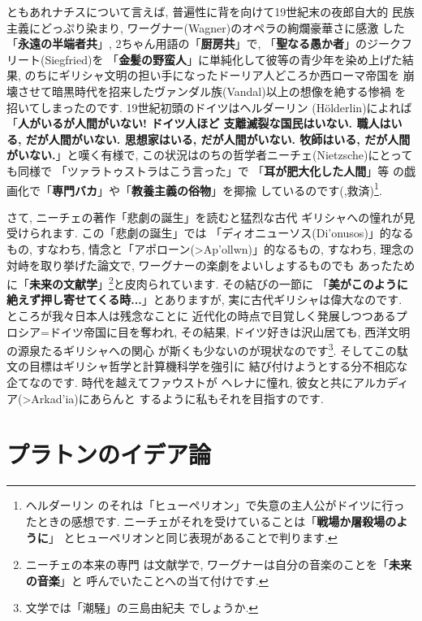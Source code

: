 ともあれナチスについて言えば, 普遍性に背を向けて19世紀末の夜郎自大的
民族主義にどっぷり染まり, ワーグナー(Wagner)のオペラの絢爛豪華さに感激
した「\textbf{永遠の半端者共}」, 2ちゃん用語の「\textbf{厨房共}」で,
 「\textbf{聖なる愚か者}」のジークフリート(Siegfried)を
「\textbf{金髪の野蛮人}」に単純化して彼等の青少年を染め上げた結果,
 のちにギリシャ文明の担い手になったドーリア人どころか西ローマ帝国を
崩壊させて暗黒時代を招来したヴァンダル族(Vandal)以上の想像を絶する惨禍
を招いてしまったのです. 19世紀初頭のドイツはヘルダーリン
(H\"olderlin)によれば「\textbf{人がいるが人間がいない! ドイツ人ほど
支離滅裂な国民はいない. 職人はいる, だが人間がいない. 思想家はいる,
 だが人間がいない. 牧師はいる, だが人間がいない.}」と嘆く有様で,
 この状況はのちの哲学者ニーチェ(Nietzsche)にとっても同様で
「ツァラトゥストラはこう言った」で 「\textbf{耳が肥大化した人間}」等
の戯画化で「\textbf{専門バカ}」や「\textbf{教養主義の俗物}」を揶揄
しているのです(\cite{ツァラトゥストラ},救済)\footnote{ヘルダーリン
のそれは「ヒューペリオン」で失意の主人公がドイツに行ったときの感想です.
 ニーチェがそれを受けていることは「\textbf{戦場か屠殺場のように}」
 とヒューペリオンと同じ表現があることで判ります.}.
\newline

さて, ニーチェの著作「悲劇の誕生」\cite{悲劇の誕生}を読むと猛烈な古代
ギリシャへの憧れが見受けられます. この「悲劇の誕生」では
「ディオニューソス(\textgreek{Di'onusos})」的なるもの, すなわち,
情念と「アポローン(\textgreek{>Ap'ollwn})」的なるもの, すなわち,
 理念の対峙を取り挙げた論文で, ワーグナーの楽劇をよいしょするものでも
あったために「\textbf{未来の文献学}」\footnote{ニーチェの本来の専門
は文献学で, ワーグナーは自分の音楽のことを「\textbf{未来の音楽}」と
呼んでいたことへの当て付けです.}と皮肉られています. その結びの一節に
「\textbf{美がこのように絶えず押し寄せてくる時...}」とありますが,
 実に古代ギリシャは偉大なのです. ところが我々日本人は残念なことに
近代化の時点で目覚しく発展しつつあるプロシア=ドイツ帝国に目を奪われ,
 その結果, ドイツ好きは沢山居ても, 西洋文明の源泉たるギリシャへの関心
が斯くも少ないのが現状なのです\footnote{文学では「潮騒」の三島由紀夫
でしょうか.}. そしてこの駄文の目標はギリシャ哲学と計算機科学を強引に
結び付けようとする分不相応な企てなのです. 時代を越えてファウストが
ヘレナに憧れ, 彼女と共にアルカディア(\textgreek{>Arkad'ia})にあらんと
するように私もそれを目指すのです.

\section{プラトンのイデア論}


